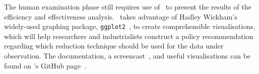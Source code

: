 The human examination phase still requires use of \mr~to present the results of the efficiency and
effectiveness analysis. \mr~takes advantage of Hadley Wickham's widely-used graphing package,
\texttt{ggplot2}~\cite{ggplot2}, to create comprehensible visualisations, which will help researchers and
industrialists construct a policy recommendation regarding which reduction technique should be used for the
data under observation. The documentation, a screencast~\cite{asciinema}, and useful visualisations can be
found on \mr's GitHub page~\cite{tool}.


